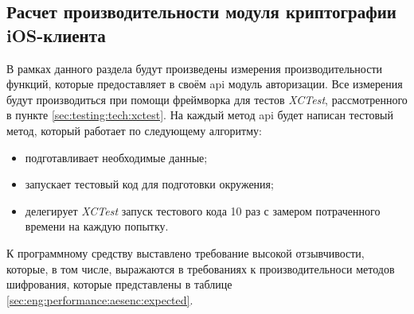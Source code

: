\subsection{Расчет производительности модуля криптографии iOS-клиента}
\label{sec:eng:performance}

В рамках данного раздела будут произведены измерения производительности функций, которые предоставляет в своём \gls{api} модуль авторизации. Все измерения будут производиться при помощи фреймворка для тестов \textit{XCTest}, рассмотренного в пункте \ref{sec:testing:tech:xctest}. На каждый метод \gls{api} будет написан тестовый метод, который работает по следующему алгоритму:

\begin{itemize}
	\item подготавливает необходимые данные;
	\item запускает тестовый код для подготовки окружения;
	\item делегирует \textit{XCTest} запуск тестового кода 10 раз с замером потраченного времени на каждую попытку.
\end{itemize}

К программному средству выставлено требование высокой отзывчивости, которые, в том числе, выражаются в требованиях к производительноси методов шифрования, которые представлены в таблице \ref{sec:eng:performance:aesenc:expected}.



\newcommand{\perfDev}{\text{П}_\text{о}}
\newcommand{\perfLimit}{\text{П}_\text{пд}}
\newcommand{\perfMax}{\text{П}_\text{макс}}
\newcommand{\perfMin}{\text{П}_\text{мин}}
\newcommand{\perfAverage}{\text{П}_\text{ср}}


